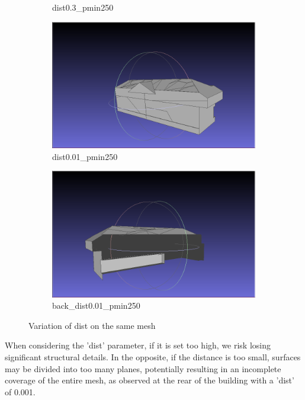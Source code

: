\documentclass{article}
\begin{document}
\begin{figure}[H]
\begin{subfigure}[b]{0.45\textwidth}
      \caption{dist0.3\_pmin250}
      \label{fig:dist0.3_pmin250}
    \end{subfigure}
    \hfill
    \begin{subfigure}[b]{0.45\textwidth}
      \includegraphics[width=\textwidth]{../../images/screen_kinetic/dist_001_pmin_250.png}
      \caption{dist0.01\_pmin250}
      \label{fig:dist0.01_pmin300}
    \end{subfigure}
    \vfill
    \begin{subfigure}[b]{0.45\textwidth}
      \includegraphics[width=\textwidth]{../../images/screen_kinetic/back_dist001_pmin250.png}
      \caption{back\_dist0.01\_pmin250}
      \label{fig:back_dist0.01_pmin250}
    \end{subfigure}
    \caption{Variation of dist on the same mesh}
    \label{fig:variation_pmin}
\end{figure}

  When considering the 'dist' parameter, if it is set too high, we risk losing significant structural details. 
  In the opposite, if the distance is too small, surfaces may be divided into too many planes, potentially resulting in an incomplete coverage of the entire mesh, 
  as observed at the rear of the building with a 'dist' of 0.001.
\end{document}

